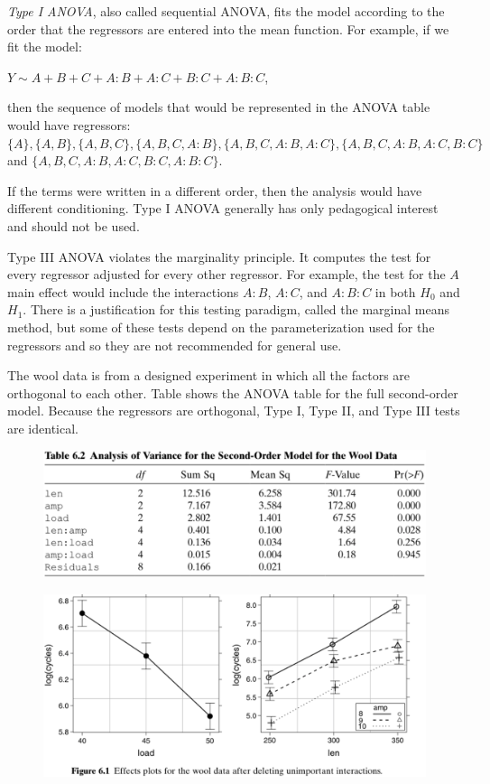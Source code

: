 \documentclass[14pt]{extarticle}
\begin{document}
\textit{Type I ANOVA}, also called sequential ANOVA, fits the model according to the order that the regressors are entered into the mean function. For example, if we fit the model:

$Y \sim A + B + C + A:B + A:C + B:C + A:B:C$,

then the sequence of models that would be represented in the ANOVA table would have regressors: 
$\{A\}, \{A, B\}, \{A, B, C\}, \{A, B, C, A:B\}, \{A, B, C, A:B, A:C\}, \{A, B, C, A:B, A:C, B:C\}$ and $\{A, B, C, A:B, A:C, B:C, A:B:C\}$.

If the terms were written in a different order, then the analysis would have different conditioning. Type I ANOVA generally has only pedagogical interest and should not be used.

Type III ANOVA violates the marginality principle. It computes the test for every regressor adjusted for every other regressor. For example, the test for the $A$ main effect would include the interactions $A:B$, $A:C$, and $A:B:C$ in both $H_0$ and $H_1$. There is a justification for this testing paradigm, called the marginal means method, but some of these tests depend on the parameterization used for the regressors and so they are not recommended for general use.

The wool data is from a designed experiment in which all the factors are orthogonal to each other. Table shows the ANOVA table for the full second-order model. Because the regressors are orthogonal, Type I, Type II, and Type III tests are identical.
\begin{figure}[H]
    \centering
    \includegraphics[width=1\textwidth]{fig4.png}
\end{figure}
\begin{figure}[H]
    \centering
    \includegraphics[width=1\textwidth]{fig5.png}
\end{figure}
\end{document}
